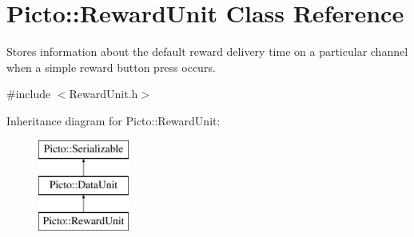 \hypertarget{class_picto_1_1_reward_unit}{\section{Picto\-:\-:Reward\-Unit Class Reference}
\label{class_picto_1_1_reward_unit}
}


Stores information about the default reward delivery time on a particular channel when a simple reward button press occurs.  




{\ttfamily \#include $<$Reward\-Unit.\-h$>$}

Inheritance diagram for Picto\-:\-:Reward\-Unit\-:\begin{figure}[H]
\begin{center}
\leavevmode
\includegraphics[height=3.000000cm]{class_picto_1_1_reward_unit}
\end{center}
\end{figure}
